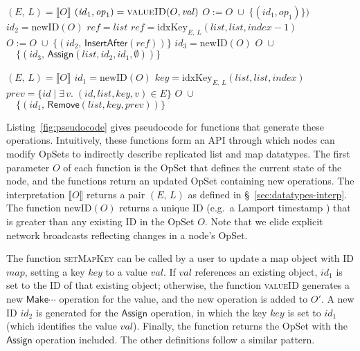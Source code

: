 \begin{algorithm}
\begin{minipage}[t]{0.5\textwidth}
\begin{algorithmic}[0]
    \State $(E,\, L) = \llbracket O \rrbracket$
    \State $(\mathit{id}_1, \mathit{op}_1) = \Call{valueID}{O, \mathit{val}}$
    \State $O := O \;\cup\; \big\{ (\mathit{id}_1, \mathit{op}_1) \big\})$
    \EndIf
    \State $\mathit{id}_2 = \mathrm{newID}(O)$
    \State $\mathit{ref} = \mathit{list}$
    \Else
    \State $\mathit{ref} = \mathrm{idxKey}_{E,\, L}(\mathit{list}, \mathit{list}, \mathit{index} - 1)$
    \EndIf
    \State $O := O \;\cup\; \big\{ (\mathit{id}_2,\, \mathsf{InsertAfter}(\mathit{ref})) \big\}$
    \State $\mathit{id}_3 = \mathrm{newID}(O)$
    \State \Return $O \;\cup$
    \State $\quad\big\{ (\mathit{id}_3,\, \mathsf{Assign}(\mathit{list}, \mathit{id}_2, \mathit{id}_1, \emptyset)) \big\}$
    \EndFunction\Statex

    \State $(E,\, L) = \llbracket O \rrbracket$
    \State $\mathit{id}_1 = \mathrm{newID}(O)$
    \State $\mathit{key} = \mathrm{idxKey}_{E,\, L}(\mathit{list}, \mathit{list}, \mathit{index})$
    \State $\mathit{prev} = \{ \mathit{id} \mid \exists\,v.\; (\mathit{id}, \mathit{list}, \mathit{key}, v) \in E \}$
    \State \Return $O \;\cup$
    \State $\quad\big\{ (\mathit{id}_1,\, \mathsf{Remove}(\mathit{list}, \mathit{key}, \mathit{prev})) \big\}$
    \EndFunction
\end{algorithmic}
\end{minipage}
\end{algorithm}

\noindent
Listing~\ref{fig:pseudocode} gives pseudocode for functions that generate these operations.
Intuitively, these functions form an API through which nodes can modify OpSets to indirectly describe replicated list and map datatypes.
The first parameter $O$ of each function is the OpSet that defines the current state of the node, and the functions return an updated OpSet containing new operations.
The interpretation $\llbracket O \rrbracket$ returns a pair $(E,\, L)$ as defined in \S~\ref{sec:datatypes-interp}.
The function $\mathrm{newID}(O)$ returns a unique ID (e.g.\ a Lamport timestamp \cite{Lamport:1978jq}) that is greater than any existing ID in the OpSet $O$.
Note that we elide explicit network broadcasts reflecting changes in a node's OpSet.

The function \textsc{setMapKey} can be called by a user to update a map object with ID $\mathit{map}$, setting a key $\mathit{key}$ to a value $\mathit{val}$.
If $\mathit{val}$ references an existing object, $\mathit{id}_1$ is set to the ID of that existing object; otherwise, the function \textsc{valueID} generates a new $\mathsf{Make}\cdots$ operation for the value, and the new operation is added to $O'$.
A new ID $\mathit{id}_2$ is generated for the $\mathsf{Assign}$ operation, in which the key $\mathit{key}$ is set to $\mathit{id}_1$ (which identifies the value $\mathit{val}$).
Finally, the function returns the OpSet with the $\mathsf{Assign}$ operation included.
The other definitions follow a similar pattern.

